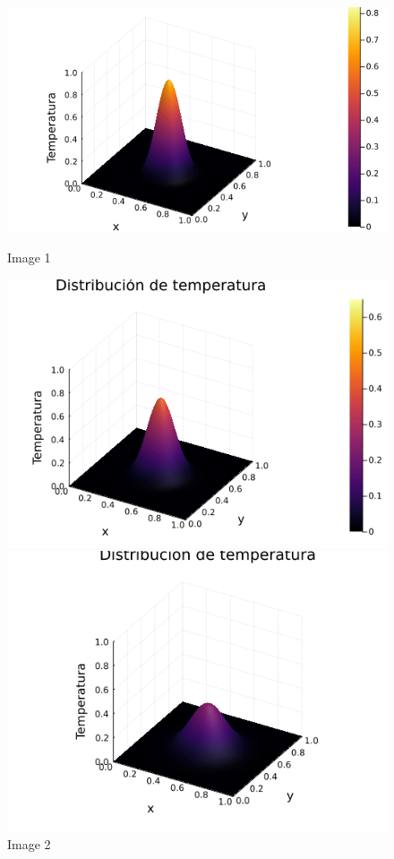 \begin{figure}[h!]
    \centering
    \begin{minipage}[b]{0.3\textwidth}
        \centering
        \includegraphics[width=\textwidth]{Figures/inicb.png}
        \caption{Image 1}
    \end{minipage}
    \hfill
    \begin{minipage}[b]{0.3\textwidth}
        \centering
        \includegraphics[width=\textwidth]{Figures/inic.png}
        \caption{Image 2}
    \end{minipage}
    \hfill
    \begin{minipage}[b]{0.3\textwidth}
        \centering
        \includegraphics[width=\textwidth]{Figures/end.png}

\end{minipage}
\end{figure}
